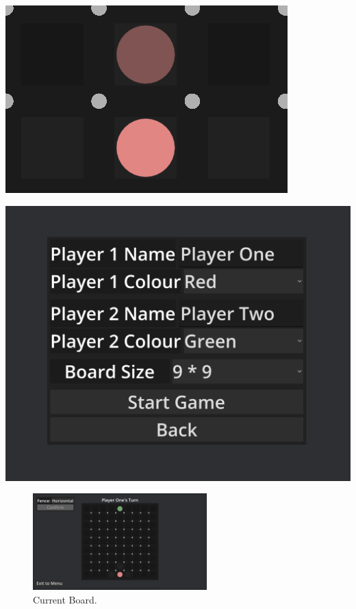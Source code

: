 \documentclass[progress]{cmpreport}
\begin{document}
\begin{minipage}[b]{0.45\textwidth}
    \centering
    \includegraphics[width=\textwidth]{images/pawn_movement.png}
\end{minipage}%
\hfill
\begin{minipage}[b]{0.45\textwidth}
    \centering
    \includegraphics[width=\textwidth]{images/board_options.png}
\end{minipage}


\begin{figure}[h]
    \centering
    \includegraphics[width=0.6\textwidth]{images/current_board.png}
    \caption{Current Board.}
    \label{fig:board}
\end{figure}
\end{document}
